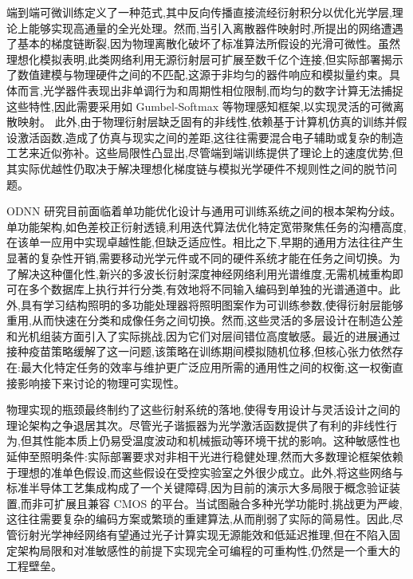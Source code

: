 端到端可微训练定义了一种范式,其中反向传播直接流经衍射积分以优化光学层,理论上能够实现高通量的全光处理。然而,当引入离散器件映射时,所提出的网络遭遇了基本的梯度链断裂,因为物理离散化破坏了标准算法所假设的光滑可微性。虽然理想化模拟表明,此类网络利用无源衍射层可扩展至数千亿个连接,但实际部署揭示了数值建模与物理硬件之间的不匹配,这源于非均匀的器件响应和模拟量约束。具体而言,光学器件表现出非单调行为和周期性相位限制,而均匀的数字计算无法捕捉这些特性,因此需要采用如 Gumbel-Softmax 等物理感知框架,以实现灵活的可微离散映射。\citep{doi_10_1145_3508352_3549378_13c53996} 此外,由于物理衍射层缺乏固有的非线性,依赖基于计算机仿真的训练并假设激活函数,造成了仿真与现实之间的差距,这往往需要混合电子辅助或复杂的制造工艺来近似弥补。这些局限性凸显出,尽管端到端训练提供了理论上的速度优势,但其实际优越性仍取决于解决理想化梯度链与模拟光学硬件不规则性之间的脱节问题。\citep{doi_10_1145_3508352_3549378_13c53996} \citep{doi_10_1126_science_aat8084_e055772d} \citep{doi_10_1109_dac56929_2023_10247715_f78d6713} \citep{doi_10_1126_sciadv_adu0904_786138ff}

ODNN 研究目前面临着单功能优化设计与通用可训练系统之间的根本架构分歧。单功能架构,如色差校正衍射透镜,利用迭代算法优化特定宽带聚焦任务的沟槽高度,在该单一应用中实现卓越性能,但缺乏适应性。相比之下,早期的通用方法往往产生显著的复杂性开销,需要移动光学元件或不同的硬件系统才能在任务之间切换。为了解决这种僵化性,新兴的多波长衍射深度神经网络利用光谱维度,无需机械重构即可在多个数据库上执行并行分类,有效地将不同输入编码到单独的光谱通道中。此外,具有学习结构照明的多功能处理器将照明图案作为可训练参数,使得衍射层能够重用,从而快速在分类和成像任务之间切换。然而,这些灵活的多层设计在制造公差和光机组装方面引入了实际挑战,因为它们对层间错位高度敏感。最近的进展通过接种疫苗策略缓解了这一问题,该策略在训练期间模拟随机位移,但核心张力依然存在:最大化特定任务的效率与维护更广泛应用所需的通用性之间的权衡,这一权衡直接影响接下来讨论的物理可实现性。\citep{doi_10_1038_srep21545_ae20cc7d} \citep{doi_10_1515_nanoph_2022_0615_9a3be8d6} \citep{doi_10_1364_ol_591818_8738c4b1} \citep{doi_10_1515_nanoph_2020_0291_c4a9f42d}

物理实现的瓶颈最终制约了这些衍射系统的落地,使得专用设计与灵活设计之间的理论架构之争退居其次。尽管光子谐振器为光学激活函数提供了有利的非线性行为,但其性能本质上仍易受温度波动和机械振动等环境干扰的影响。这种敏感性也延伸至照明条件:实际部署要求对非相干光进行稳健处理,然而大多数理论框架依赖于理想的准单色假设,而这些假设在受控实验室之外很少成立。此外,将这些网络与标准半导体工艺集成构成了一个关键障碍,因为目前的演示大多局限于概念验证装置,而非可扩展且兼容 CMOS 的平台。当试图融合多种光学功能时,挑战更为严峻,这往往需要复杂的编码方案或繁琐的重建算法,从而削弱了实际的简易性。因此,尽管衍射光学神经网络有望通过光子计算实现无源能效和低延迟推理,但在不陷入固定架构局限和对准敏感性的前提下实现完全可编程的可重构性,仍然是一个重大的工程壁垒。\citep{doi_10_3390_nano14080697_c372a140} \citep{doi_10_1364_oe_523619_ddeb1b53} \citep{doi_10_1038_s41467_022_28702_0_1b79b43c} \citep{doi_10_1364_optica_583686_6b84680e} \citep{doi_10_1002_lpor_202200348_d54cae18}

